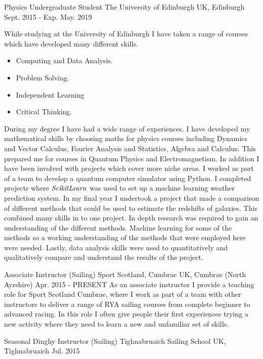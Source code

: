 \begin{cventries}
  \cventry
    {Physics Undergraduate Student} %
    {The University of Edinburgh} %
    {UK, Edinburgh} %
    {Sept. 2015 - Exp. May. 2019} %
    {
      While studying at the University of Edinburgh I have taken a range of courses which have developed many different skills. 
      \begin{itemize}
          \item Computing and Data Analysis.
          \item Problem Solving.
          \item Independent Learning
          \item Critical Thinking.
      \end{itemize}
      During my degree I have had a wide range of experiences. I have developed my mathematical skills by choosing maths for physics courses including Dynamics and Vector Calculus, Fourier Analysis and Statistics, Algebra and Calculus. This prepared me for courses in Quantum Physics and Electromagnetism. In addition I have been involved with projects which cover more niche areas. I worked as part of a team to develop a quantum computer simulator using Python. I completed projects where $\it{Scikit\space Learn}$  was used to set up a machine learning weather prediction system. In my final year I undertook a project that made a comparison of different methods that could be used to estimate the redshifts of galaxies. This combined many skills in to one project. In depth research was required to gain an understanding of the different methods. Machine learning for some of the methods so a working understanding of the methods that were employed here were needed. Lastly, data analysis skills were used to quantitatively and qualitatively compare and understand the results of the project.
    }

  \cventry
    {Associate Instructor (Sailing)} %
    {Sport Scotland, Cumbrae} %
    {UK, Cumbrae (North Ayrshire)} %
    {Apr. 2015 - PRESENT} %
    {
      As an associate instructor I provide a teaching role for Sport Scotland Cumbrae, where I work as part of a team with other instructors to deliver a range of RYA sailing courses from complete beginner to advanced racing. In this role I often give people their first experiences trying a new activity where they need to learn a new and unfamiliar set of skills.
    }

 \cventry
    {Seasonal Dinghy Instructor (Sailing)} %
    {Tighnabruaich Sailing School} %
    {UK, Tighnabruaich} %
    {Jul. 2015} %
    {
    }

\end{cventries}
